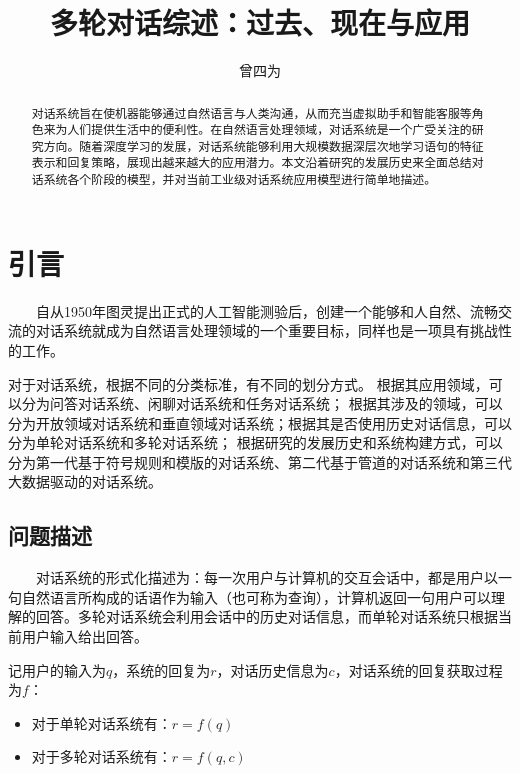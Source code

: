 \documentclass{clv3}
\begin{document}
\title{多轮对话综述：过去、现在与应用} %

\author{曾四为} %


\maketitle

\begin{abstract} %
对话系统旨在使机器能够通过自然语言与人类沟通，从而充当虚拟助手和智能客服等角色来为人们提供生活中的便利性。在自然语言处理领域，对话系统是一个广受关注的研究方向。随着深度学习的发展，对话系统能够利用大规模数据深层次地学习语句的特征表示和回复策略，展现出越来越大的应用潜力。本文沿着研究的发展历史来全面总结对话系统各个阶段的模型，并对当前工业级对话系统应用模型进行简单地描述。
\end{abstract}

\section{引言} %
$\qquad$自从1950年图灵提出正式的人工智能测验\cite{turing1950i}后，创建一个能够和人自然、流畅交流的对话系统就成为自然语言处理领域的一个重要目标，同样也是一项具有挑战性的工作。

对于对话系统，根据不同的分类标准，有不同的划分方式。
根据其应用领域，可以分为问答对话系统、闲聊对话系统和任务对话系统\cite{chen2017a}；
根据其涉及的领域，可以分为开放领域对话系统和垂直领域对话系统；根据其是否使用历史对话信息，可以分为单轮对话系统和多轮对话系统\cite{shang2015neural, mou2016sequence}；
根据研究的发展历史和系统构建方式，可以分为第一代基于符号规则和模版的对话系统、第二代基于管道的对话系统和第三代大数据驱动的对话系统。

\subsection{问题描述}
$\qquad$对话系统的形式化描述为：每一次用户与计算机的交互会话中，都是用户以一句自然语言所构成的话语作为输入（也可称为查询），计算机返回一句用户可以理解的回答。多轮对话系统会利用会话中的历史对话信息，而单轮对话系统只根据当前用户输入给出回答。

记用户的输入为$q$，系统的回复为$r$，对话历史信息为$c$，对话系统的回复获取过程为$f$：
\vspace{-10pt}
\begin{itemize}
	\setlength{\itemsep}{0pt}
	\item 对于单轮对话系统有：$r=f(q)$
	\item 对于多轮对话系统有：$r=f(q, c)$
\end{itemize}
\end{document}
